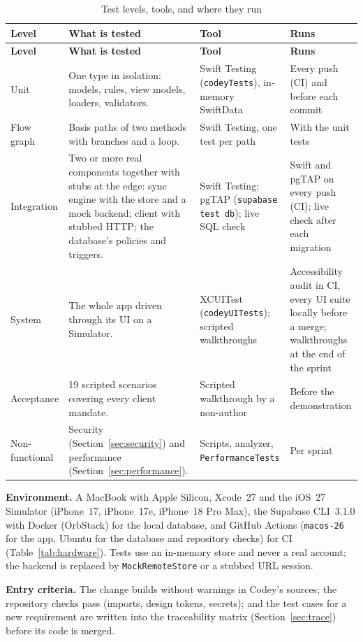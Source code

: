 \documentclass[12pt,letterpaper]{article}
\begin{document}
\begin{xltabular}{\textwidth}{@{}L{2.2cm} Y L{3.6cm} L{2.6cm}@{}}
\caption{Test levels, tools, and where they run}\label{tab:testlevels}\\
\toprule
\textbf{Level} & \textbf{What is tested} & \textbf{Tool} & \textbf{Runs} \\
\midrule
\endfirsthead
\toprule
\textbf{Level} & \textbf{What is tested} & \textbf{Tool} & \textbf{Runs} \\
\midrule
\endhead
\bottomrule
\endfoot
Unit & One type in isolation: models, rules, view models, loaders, validators. & Swift Testing (\texttt{codeyTests}), in-memory SwiftData & Every push (CI) and before each commit \\
Flow graph & Basis paths of two methods with branches and a loop. & Swift Testing, one test per path & With the unit tests \\
Integration & Two or more real components together with stubs at the edge: sync engine with the store and a mock backend; client with stubbed HTTP; the database's policies and triggers. & Swift Testing; pgTAP (\texttt{supabase test db}); live SQL check & Swift and pgTAP on every push (CI); live check after each migration \\
System & The whole app driven through its UI on a Simulator. & XCUITest (\texttt{codeyUITests}); scripted walkthroughs & Accessibility audit in CI, every UI suite locally before a merge; walkthroughs at the end of the sprint \\
Acceptance & 19 scripted scenarios covering every client mandate. & Scripted walkthrough by a non-author & Before the demonstration \\
Non-functional & Security (Section~\ref{sec:security}) and performance (Section~\ref{sec:performance}). & Scripts, analyzer, \texttt{PerformanceTests} & Per sprint \\
\end{xltabular}

\textbf{Environment.} A MacBook with Apple Silicon, Xcode~27 and the iOS~27
Simulator (iPhone~17, iPhone~17e, iPhone~18 Pro Max), the Supabase CLI~3.1.0 with
Docker (OrbStack) for the local database, and GitHub Actions (\texttt{macos-26} for
the app, Ubuntu for the database and repository checks) for CI
(Table~\ref{tab:hardware}). Tests use an in-memory store and never a real account;
the backend is replaced by \texttt{MockRemoteStore} or a stubbed URL session.

\textbf{Entry criteria.} The change builds without warnings in Codey's sources; the
repository checks pass (imports, design tokens, secrets); and the test cases for a new
requirement are written into the traceability matrix (Section~\ref{sec:trace}) before
its code is merged.
\end{document}
